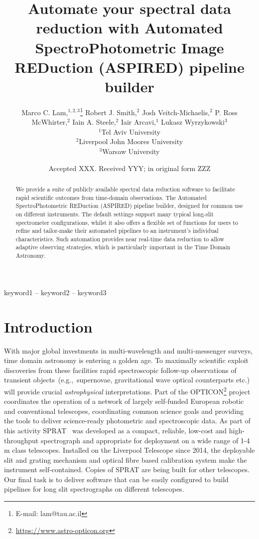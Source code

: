 \documentclass[fleqn,usenatbib]{mnras}
\title[ASPIRED]{Automate your spectral data reduction with Automated SpectroPhotometric Image REDuction (ASPIRED) pipeline builder}
\author[M. C. Lam et al.]{
Marco C. Lam,$^{1, 2, 3}$\thanks{E-mail: lam@tau.ac.il}
Robert J. Smith,$^{2}$
Josh Veitch-Michaelis,$^{2}$
P. Ross McWhirter,$^{2}$
Iain A. Steele,$^{2}$
\newauthor
Iair Arcavi,$^{1}$
Lukasz Wyrzykowski$^{3}$
\\
$^{1}$Tel Aviv University\\
$^{2}$Liverpool John Moores University\\
$^{3}$Warsaw University
}
\date{Accepted XXX. Received YYY; in original form ZZZ}
\begin{document}
\label{firstpage}
\pagerange{\pageref{firstpage}--\pageref{lastpage}}
\maketitle

\begin{abstract}
We provide a suite of publicly available spectral data reduction software
to facilitate rapid scientific outcomes from time-domain observations. The Automated
SpectroPhotometric REDuction (\textsc{ASPIRED}) pipeline builder, designed for common
use on different instruments. The default settings support many typical long-slit
spectrometer configurations, whilst it also offers a flexible set of functions for
users to refine and tailor-make their automated pipelines to an instrument's
individual characteristics. Such automation provides near real-time data reduction
to allow adaptive observing strategies, which is particularly important in the Time
Domain Astronomy.
\end{abstract}

\begin{keywords}
keyword1 -- keyword2 -- keyword3
\end{keywords}



\section{Introduction}
With major global investments in multi-wavelength and multi-messenger surveys, time domain
astronomy is entering a golden age. To maximally scientific exploit discoveries from these
facilities rapid spectroscopic follow-up observations of transient objects~(e.g.,\ supernovae,
gravitational wave optical counterparts etc.) will provide crucial {\em astrophysical} 
interpretations. Part of the OPTICON\footnote{\url{https://www.astro-opticon.org}} project
coordinates the operation of a network of largely self-funded European robotic and conventional
telescopes, coordinating common science goals and providing the tools to deliver science-ready
photometric and spectroscopic data. As part of this activity SPRAT~\citep{2014SPIE.9147E..8HP}
was developed as a compact, reliable, low-cost and high-throughput spectrograph and appropriate
for deployment on a wide range of 1-4\,m class telescopes. Installed on the Liverpool Telescope
since 2014, the deployable slit and grating mechanism and optical fibre based calibration
system make the instrument self-contained. Copies of SPRAT are being built for other 
telescopes. Our final task is to deliver software that can be easily configured to build
pipelines for long slit spectrographs on different telescopes.
\end{document}
